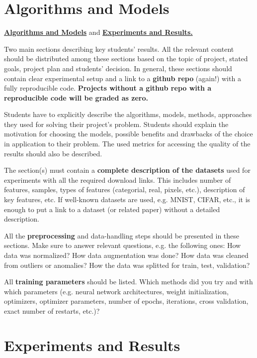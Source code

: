 \documentclass{article}
\begin{document}
 \section{Algorithms and Models}\label{algorithms_and_models}

\underline{\textbf{Algorithms and Models}} and \underline{\textbf{Experiments and Results.}}

Two main sections describing key students' results. All the relevant content should be distributed among these sections based on the topic of project, stated goals, project plan and students' decision. In general, these sections should contain clear experimental setup and a  link to a \textbf{github repo} (again!) with a fully reproducible code. \textbf{Projects without a github repo with a reproducible code will be graded as zero.}

Students have to explicitly describe the algorithms, models, methods, approaches they used for solving their project's problem. Students should explain the motivation for choosing the models, possible benefits and drawbacks of the choice in application to their problem. The used metrics for accessing the quality of the results should also be described.

The section(s) must contain a \textbf{complete description of the datasets} used for experiments with all the required download links. This includes number of features, samples, types of features (categorial, real, pixels, etc.), description of key features, etc. If well-known datasets are used, e.g. MNIST, CIFAR, etc., it is enough to put a link to a dataset (or related paper) without a detailed description.

All the \textbf{preprocessing} and data-handling steps should be presented in these sections. Make sure to answer relevant questions, e.g. the following ones: How data was normalized? How data augmentation was done? How data was cleaned from outliers or anomalies? How the data was splitted for train, test, validation?

All \textbf{training parameters} should be listed. Which methods did you try and with which parameters (e.g. neural network architectures, weight initialization, optimizers, optimizer parameters, number of epochs, iterations, cross validation, exact number of restarts, etc.)?

\section{Experiments and Results}\label{experiments_and_results}
\end{document}
